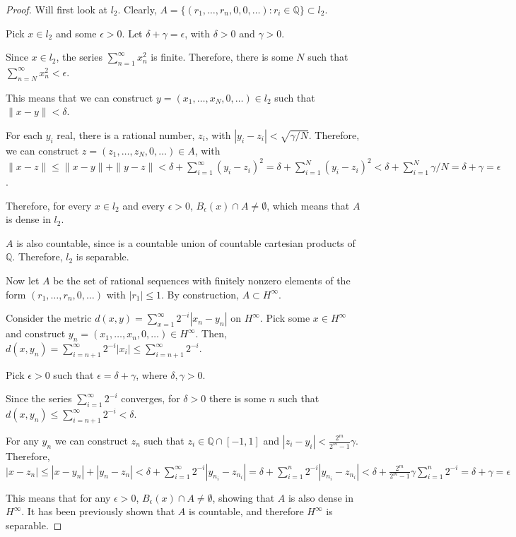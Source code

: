 \begin{proof}
Will first look at $l_2$. Clearly, $A = \{(r_1, \dots, r_n, 0, 0, \dots): r_i \in \mathbb{Q}\} \subset l_2$.

Pick $x \in l_2$ and some $\epsilon > 0$. Let $\delta + \gamma = \epsilon$, with $\delta > 0$ and $\gamma > 0$.

Since $x\in l_2$, the series $\sum_{n=1}^\infty x_n^2$ is finite. Therefore, there is some $N$ such that $\sum_{n=N}^\infty x_n^2 < \epsilon$.

This means that we can construct $y = (x_1, \dots, x_N, 0, \dots) \in l_2$ such that $\|x-y\| < \delta$.

For each $y_i$ real, there is a rational number, $z_i$, with $|y_i - z_i| < \sqrt{\gamma/N}$. Therefore, we can construct $z = (z_1, \dots, z_N, 0, \dots) \in A$, with $\|x - z\| \leq \|x-y\| + \|y-z\| < \delta + \sum_{i=1}^\infty (y_i - z_i)^2 = \delta + \sum_{i=1}^N (y_i - z_i)^2 < \delta + \sum_{i=1}^N \gamma/N = \delta + \gamma = \epsilon$.

Therefore, for every $x \in l_2$ and every $\epsilon > 0$, $B_\epsilon(x) \cap A \neq \emptyset$, which means that $A$ is dense in $l_2$.

$A$ is also countable, since is a countable union of countable cartesian products of $\mathbb{Q}$. Therefore, $l_2$ is separable.


\vspace{1em}

Now let $A$ be the set of rational sequences with finitely nonzero elements of the form $(r_1, \dots, r_n, 0, \dots)$ with $|r_1| \leq 1$. By construction, $A \subset H^\infty$.

Consider the metric $d(x,y) = \sum_{x=1}^\infty 2^{-i} |x_n - y_n|$ on $H^\infty$. Pick some $x \in H^\infty$ and construct $y_n = (x_1, \dots, x_n, 0, \dots) \in H^\infty$. Then, $d(x,y_n) = \sum_{i=n+1}^\infty 2^{-i}|x_i| \leq \sum_{i=n+1}^\infty 2^{-i}$.

Pick $\epsilon > 0$ such that $\epsilon = \delta + \gamma$, where $\delta, \gamma >0$. 

Since the series $\sum_{i=1}^\infty 2^{-i}$ converges, for $\delta > 0$ there is some $n$ such that $d(x, y_n) \leq \sum_{i=n+1}^\infty 2^{-i} < \delta$. 

For any $y_n$ we can construct $z_n$ such that $z_i \in \mathbb{Q} \cap [-1,1]$ and $|z_i - y_i| < \frac{2^m}{2^m-1}\gamma$. Therefore, $|x - z_n| \leq |x - y_n| + |y_n - z_n| < \delta + \sum_{i=1}^\infty  2^{-i}|y_{n_i} - z_{n_i}| = \delta + \sum_{i=1}^n  2^{-i}|y_{n_i} - z_{n_i}| < \delta + \frac{2^m}{2^m-1}\gamma \sum_{i=1}^n 2^{-i}= \delta + \gamma = \epsilon$

This means that for any $\epsilon >0$, $B_\epsilon(x) \cap A \neq \emptyset$, showing that $A$ is also dense in $H^\infty$. It has been previously shown that $A$ is countable, and therefore $H^\infty$ is separable.

\end{proof}

